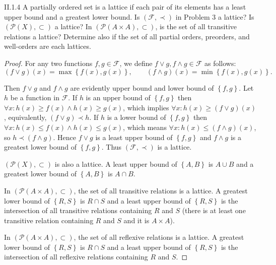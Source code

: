 \begin{problem}{II.1.4}
A partially ordered set is a lattice if each pair of its elements has a least upper bound and a greatest lower bound. Is \((\mathscr{F}, \prec)\) in Problem 3 a lattice? Is \((\mathscr{P}(X), \subset)\) a lattice? In \((\mathscr{P}(A \times A), \subset)\), is the set of all transitive relations a lattice? Determine also if the set of all partial orders, preorders, and well-orders are each lattices.
\end{problem}

\begin{proof}
	For any two functions \( f, g \in \mathscr{F} \), we define \( f \lor g, f \land g \in \mathscr{F} \) as follows:
	\[
		(f \lor g)(x) = \max\left\{ f(x), g(x) \right\},\qquad (f \land g)(x) = \min\left\{ f(x), g(x) \right\}.
	\]

	Then \( f \lor g \) and \( f \land g \) are evidently upper bound and lower bound of \( \left\{ f, g \right\} \). Let \( h \) be a function in \( \mathscr{F} \). If \( h \) is an upper bound of \( \left\{ f, g \right\} \) then \( \forall x: h(x) \ge f(x) \land h(x) \ge g(x) \), which implies \( \forall x: h(x) \ge (f \lor g)(x) \), equivalently, \( (f \lor g) \prec h \). If \( h \) is a lower bound of \( \left\{ f, g \right\} \) then \( \forall x: h(x) \le f(x) \land h(x) \le g(x) \), which means \( \forall x: h(x) \le (f \land g)(x) \), so \( h \prec (f \land g) \). Hence \( f\lor g \) is a least upper bound of \( \left\{ f, g \right\} \) and \( f\land g \) is a greatest lower bound of \( \left\{ f, g \right\} \). Thus \( (\mathscr{F}, \prec) \) is a lattice.

	\( (\mathscr{P}(X), \subset) \) is also a lattice. A least upper bound of \( \left\{ A, B \right\} \) is \( A \cup B \) and a greatest lower bound of \( \left\{ A, B \right\} \) is \( A \cap B \).

	In \( (\mathscr{P}(A\times A), \subset) \), the set of all transitive relations is a lattice. A greatest lower bound of \( \left\{ R, S \right\} \) is \( R \cap S \) and a least upper bound of \( \left\{ R, S \right\} \) is the intersection of all transitive relations containing \( R \) and \( S \)  (there is at least one transitive relation containing \( R \) and \( S \) and it is \( A\times A \)).

	In \( (\mathscr{P}(A\times A), \subset) \), the set of all reflexive relations is a lattice. A greatest lower bound of \( \left\{ R, S \right\} \) is \( R \cap S \) and a least upper bound of \( \left\{ R, S \right\} \) is the intersection of all reflexive relations containing \( R \) and \( S \).


\end{proof}

